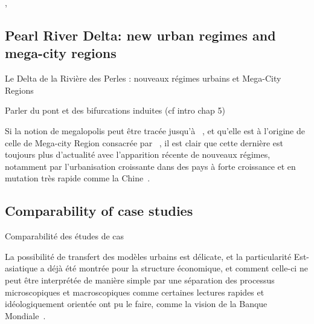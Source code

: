 \cite{Padeiro2012}, \cite{PADEIRO201344}











\subsection[Pearl River Delta][Le Delta de la Rivière des Perles]{Pearl River Delta: new urban regimes and mega-city regions}{Le Delta de la Rivière des Perles : nouveaux régimes urbains et Mega-City Regions}



Parler du pont et des bifurcations induites (cf intro chap 5)

Si la notion de megalopolis peut être tracée jusqu'à ~\cite{gottmann1964megalopolis}, et qu'elle est à l'origine de celle de Mega-city Region consacrée par ~\cite{hall2006polycentric}, il est clair que cette dernière est toujours plus d'actualité avec l'apparition récente de nouveaux régimes, notamment par l'urbanisation croissante dans des pays à forte croissance et en mutation très rapide comme la Chine~\cite{swerts2015megacities}.







\subsection{Comparability of case studies}{Comparabilité des études de cas}


La possibilité de transfert des modèles urbains est délicate, et la particularité Est-asiatique a déjà été montrée pour la structure économique, et comment celle-ci ne peut être interprétée de manière simple par une séparation des processus microscopiques et macroscopiques comme certaines lectures rapides et idéologiquement orientée ont pu le faire, comme la vision de la Banque Mondiale~\cite{amsden1994isn}.










\stars




